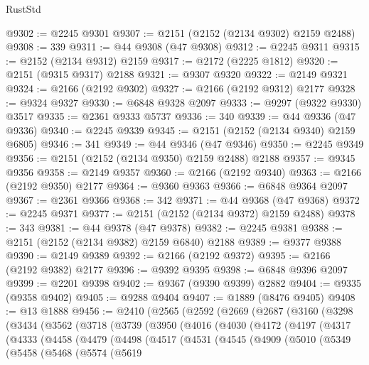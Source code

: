 \begin{lexlean}{RustStd}
\begin{coremodule}
@9302 := @2245 @9301
@9307 := @2151 (@2152 (@2134 @9302) @2159 @2488)
@9308 := 339
@9311 := @44 @9308 (@47 @9308)
@9312 := @2245 @9311
@9315 := @2152 (@2134 @9312) @2159
@9317 := @2172 (@2225 @1812)
@9320 := @2151 (@9315 @9317) @2188
@9321 := @9307 @9320
@9322 := @2149 @9321
@9324 := @2166 (@2192 @9302)
@9327 := @2166 (@2192 @9312) @2177
@9328 := @9324 @9327
@9330 := @6848 @9328 @2097
@9333 := @9297 (@9322 @9330) @3517
@9335 := @2361 @9333 @5737
@9336 := 340
@9339 := @44 @9336 (@47 @9336)
@9340 := @2245 @9339
@9345 := @2151 (@2152 (@2134 @9340) @2159 @6805)
@9346 := 341
@9349 := @44 @9346 (@47 @9346)
@9350 := @2245 @9349
@9356 := @2151 (@2152 (@2134 @9350) @2159 @2488) @2188
@9357 := @9345 @9356
@9358 := @2149 @9357
@9360 := @2166 (@2192 @9340)
@9363 := @2166 (@2192 @9350) @2177
@9364 := @9360 @9363
@9366 := @6848 @9364 @2097
@9367 := @2361 @9366
@9368 := 342
@9371 := @44 @9368 (@47 @9368)
@9372 := @2245 @9371
@9377 := @2151 (@2152 (@2134 @9372) @2159 @2488)
@9378 := 343
@9381 := @44 @9378 (@47 @9378)
@9382 := @2245 @9381
@9388 := @2151 (@2152 (@2134 @9382) @2159 @6840) @2188
@9389 := @9377 @9388
@9390 := @2149 @9389
@9392 := @2166 (@2192 @9372)
@9395 := @2166 (@2192 @9382) @2177
@9396 := @9392 @9395
@9398 := @6848 @9396 @2097
@9399 := @2201 @9398
@9402 := @9367 (@9390 @9399) @2882
@9404 := @9335 (@9358 @9402)
@9405 := @9288 @9404
@9407 := @1889 (@8476 @9405)
@9408 := @13 @1888
@9456 := @2410
    (@2565
      (@2592
        (@2669
          (@2687
            (@3160
              (@3298
                (@3434
                  (@3562
                    (@3718
                      (@3739
                        (@3950
                          (@4016
                            (@4030
                              (@4172
                                (@4197
                                  (@4317
                                    (@4333
                                      (@4458
                                        (@4479
                                          (@4498
                                            (@4517
                                              (@4531
                                                (@4545
                                                  (@4909
                                                    (@5010
                                                      (@5349
                                                        (@5458
                                                          (@5468
                                                            (@5574
                                                              (@5619

\end{coremodule}
\end{lexlean}
